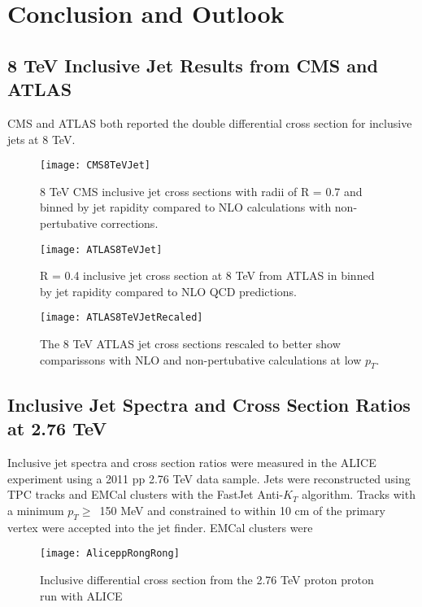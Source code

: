 \chapter{Conclusion and Outlook} \label{ch:cando}

\section{8 TeV Inclusive Jet Results from CMS and ATLAS}

CMS\cite{CMS:2013kda} and ATLAS\cite{Aaboud:2017dvo} both reported the double differential cross section for inclusive jets at 8 TeV.  

\begin{figure}[h]
\texttt{[image: CMS8TeVJet]}
\centering
\caption{8 TeV CMS inclusive jet cross sections with radii of R = 0.7 and binned by jet rapidity compared to NLO calculations with non-pertubative corrections\cite{CMS:2013kda}.}
\label{fig:CMS8TeVRescale}
\end{figure}

\begin{figure}[h]
\texttt{[image: ATLAS8TeVJet]}
\centering
\caption{R = 0.4 inclusive jet cross section at 8 TeV from ATLAS in binned by jet rapidity compared to NLO QCD predictions\cite{Aaboud:2017dvo}.}
\label{fig:ATLAS8TeV}
\end{figure}

\begin{figure}[h]
\texttt{[image: ATLAS8TeVJetRecaled]}
\centering
\caption{The 8 TeV ATLAS jet cross sections rescaled to better show comparissons with NLO and non-pertubative calculations at low $p_{T}$\cite{Aaboud:2017dvo}.}
\label{fig:ATLAS8TeVRescale}
\end{figure}

\section{Inclusive Jet Spectra and Cross Section Ratios at 2.76 TeV}
Inclusive jet spectra and cross section ratios were measured in the ALICE experiment using a 2011 pp 2.76 TeV data sample\cite{MA2013319}.  Jets were reconstructed using TPC tracks and EMCal clusters with the FastJet Anti-$K_{T}$ algorithm.  Tracks with a minimum $p_{T} \geq \,$ 150 MeV and constrained to within 10 cm of the primary vertex were accepted into the jet finder.  EMCal clusters were 

\begin{figure}[h]
\texttt{[image: AliceppRongRong]}
\centering
\caption{Inclusive differential cross section from the 2.76 TeV proton proton run with ALICE}
\label{fig:RunEff}
\end{figure}

